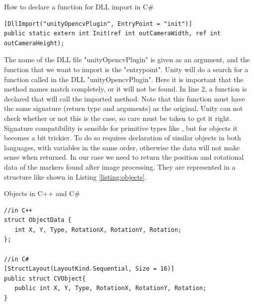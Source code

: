 \begin{listing}[H]
	\caption{How to declare a function for DLL import in C\#}
	\label{listing:dllImport}
	\begin{verbatim}
[DllImport("unityOpencvPlugin", EntryPoint = "init")]
public static extern int Init(ref int outCameraWidth, ref int outCameraHeight);
	\end{verbatim}
\end{listing}
The name of the DLL file "unityOpencvPlugin" is given as an argument, and the function that we want to import is the "entrypoint". Unity will do a search for a function called  in the DLL "unityOpencvPlugin". Here it is important that the method names match completely, or it will not be found. In line 2, a function is declared that will call the imported method. Note that this function must have the same signature (return type and arguments) as the original. Unity can not check whether or not this is the case, so care must be taken to get it right. Signature compatibility is sensible for primitive types like , but for objects it becomes a bit trickier. To do so requires declaration of similar objects in both languages, with variables in the same order, otherwise the data will not make sense when returned. In our case we need to return the position and rotational data of the markers found after image processing. They are represented in a structure like shown in Listing \ref{listing:objects}. 
\begin{listing}[H]
	\caption{Objects in C++ and C\#}
	\label{listing:objects}
	\begin{verbatim}
//in C++
struct ObjectData {
   int X, Y, Type, RotationX, RotationY, Rotation;
};

//in C#	
[StructLayout(LayoutKind.Sequential, Size = 16)]
public struct CVObject{
   public int X, Y, Type, RotationX, RotationY, Rotation;
}
	\end{verbatim}
\end{listing}

